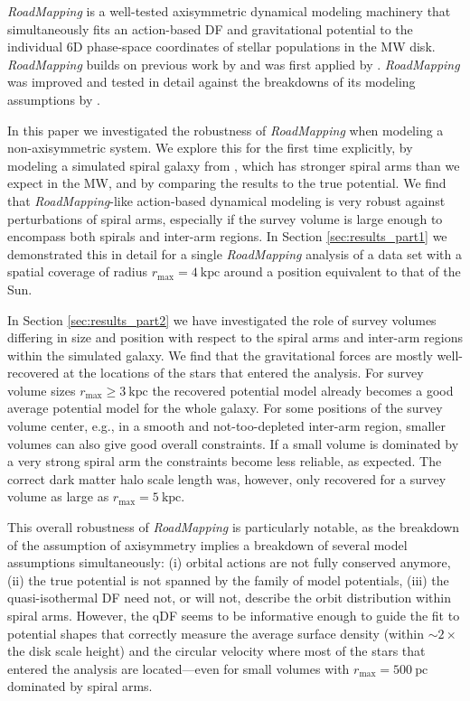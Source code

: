 \documentclass[iop,revtex4,numberedappendix,appendixfloats]{emulateapj}
\newcommand{\RM}{{\sl RoadMapping}}
\begin{document}
\RM{} is a well-tested axisymmetric dynamical modeling machinery that simultaneously fits an action-based DF and gravitational potential to the individual 6D phase-space coordinates of stellar populations in the MW disk. \RM{} builds on previous work by \citet{2011MNRAS.413.1889B,2012MNRAS.426.1324B,2015ApJS..216...29B} and was first applied by \citet{2013ApJ...779..115B}. \RM{} was improved and tested in detail against the breakdowns of its modeling assumptions by \citet{2016ApJ...830...97T}. 

In this paper we investigated the robustness of \RM{} when modeling a non-axisymmetric system. We explore this for the first time explicitly, by modeling a simulated spiral galaxy from \citet{2013ApJ...766...34D}, which has stronger spiral arms than we expect in the MW, and by comparing the results to the true potential. We find that \RM{}-like action-based dynamical modeling is very robust against perturbations of spiral arms, especially if the survey volume is large enough to encompass both spirals and inter-arm regions. In Section \ref{sec:results_part1} we demonstrated this in detail for a single \RM{} analysis of a data set with a spatial coverage of radius $r_\text{max}=4~\text{kpc}$ around a position equivalent to that of the Sun.

In Section \ref{sec:results_part2} we have investigated the role of survey volumes differing in size and position with respect to the spiral arms and inter-arm regions within the simulated galaxy. We find that the gravitational forces are mostly well-recovered at the locations of the stars that entered the analysis. For survey volume sizes $r_\text{max} \geq 3~\text{kpc}$ the recovered potential model already becomes a good average potential model for the whole galaxy. For some positions of the survey volume center, e.g., in a smooth and not-too-depleted inter-arm region, smaller volumes can also give good overall constraints. If a small volume is dominated by a very strong spiral arm the constraints become less reliable, as expected. The correct dark matter halo scale length was, however, only recovered for a survey volume as large as $r_\text{max}=5~\text{kpc}$. 

This overall robustness of \RM{} is particularly notable, as the breakdown of the assumption of axisymmetry implies a breakdown of several model assumptions simultaneously: (i) orbital actions are not fully conserved anymore, (ii) the true potential is not spanned by the family of model potentials, (iii) the quasi-isothermal DF need not, or will not, describe the orbit distribution within spiral arms. However, the qDF seems to be informative enough to guide the fit to potential shapes that correctly measure the average surface density (within $\sim2 \times$ the disk scale height) and the circular velocity where most of the stars that entered the analysis are located---even for small volumes with $r_\text{max}=500~\text{pc}$ dominated by spiral arms. 
\end{document}
